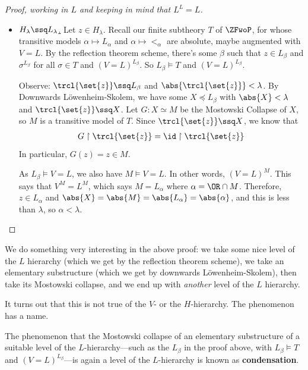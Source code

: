 \begin{proof}[Proof, working in $L$ and keeping in mind that $L^L = L$]
\begin{itemize}
        \item \underline{$H_{\lambda} \ssq L_{\lambda}$.} Let $z \in H_{\lambda}$. Recall our finite subtheory $T$ of $\ZFwoP$, for whose transitive models $\alpha \mapsto L_{\alpha}$ and $\alpha \mapsto <_{\alpha}$ are absolute, maybe augmented with $V = L$.
        By the reflection theorem scheme, there's some $\beta$ such that $z \in L_{\beta}$ and $\sigma^{L_{\beta}}$ for all $\sigma \in T$ and $(V = L)^{L_{\beta}}$. So $L_{\beta} \models T$ and $(V = L)^{L_{\beta}}$.

        Observe: $\trcl{\set{z}} \ssq L_{\beta}$ and $\abs{\trcl{\set{z}}} < \lambda$. By Downwards Löwenheim-Skolem, we have some $X \preceq L_{\beta}$ with $\abs{X} < \lambda$ and $\trcl{\set{z}} \ssq X$. Let $G : X \simeq M$ be the Mostowski Collapse of $X$, so $M$ is a transitive model of $T$. Since $\trcl{\set{z}} \ssq X$, we know that
        \begin{align*}
            G \restriction \trcl{\set{z}} = \id \restriction \trcl{\set{z}}
        \end{align*}
        In particular, $G(z) = z \in M$.

        As $L_{\beta} \models V = L$, we also have $M \models V = L$. In other words, $(V = L)^M$. This says that $V^M = L^M$, which says $M = L_{\alpha}$ where $\alpha = \OR \cap M$. Therefore, $z \in L_{\alpha}$ and $\abs{X} = \abs{M} = \abs{L_{\alpha}} = \abs{\alpha}$, and this is less than $\lambda$, so $\alpha < \lambda$.
    \end{itemize}
\end{proof}

We do something very interesting in the above proof: we take some nice level of the $L$ hierarchy (which we get by the reflection theorem scheme), we take an elementary substructure (which we get by downwards Löwenheim-Skolem), then take its Mostowski collapse, and we end up with \textit{another} level of the $L$ hierarchy.

It turns out that this is not true of the $V$- or the $H$-hierarchy. The phenomenon has a name.

\begin{boxdefinition}[Condensation]
    The phenomenon that the Mostowski collapse of an elementary substructure of a suitable level of the $L$-hierarchy---such as the $L_{\beta}$ in the proof above, with $L_{\beta} \models T$ and $(V = L)^{L_{\beta}}$---is again a level of the $L$-hierarchy is known as \textbf{condensation}.
\end{boxdefinition}

